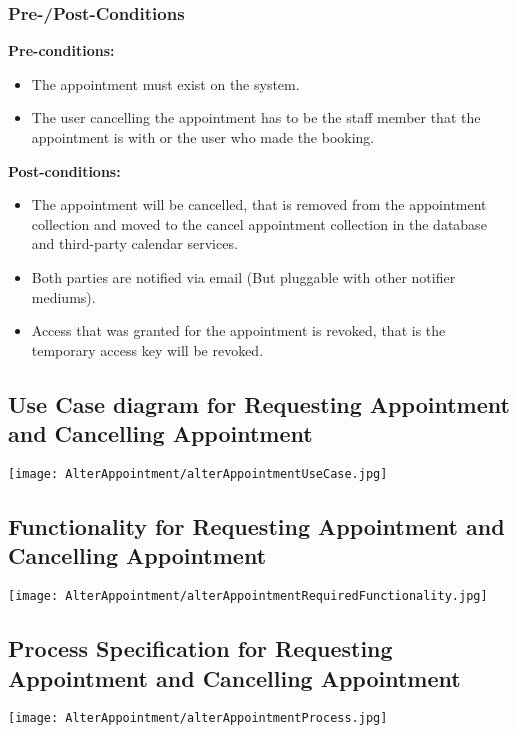 \subsubsection{Pre-/Post-Conditions}
\textbf{Pre-conditions:} 
	\begin{itemize}
		\item The appointment must exist on the system.
		\item The user cancelling the appointment has to be the staff member that the appointment is with or the user who made the booking.
	\end{itemize}
\textbf{Post-conditions:} 
	\begin{itemize}
		\item The appointment will be cancelled, that is removed from the appointment collection and moved to the cancel appointment collection in the database and third-party calendar services.
		\item  Both parties are notified via email (But pluggable with other notifier mediums).
		\item Access that was granted for the appointment is revoked, that is the temporary access key will be revoked. 
	\end{itemize}

\subsection{Use Case diagram for Requesting Appointment and Cancelling Appointment}
	\texttt{[image: AlterAppointment/alterAppointmentUseCase.jpg]}
	
\subsection{Functionality for Requesting Appointment and Cancelling Appointment}
	\texttt{[image: AlterAppointment/alterAppointmentRequiredFunctionality.jpg]}
	
\subsection{Process Specification for Requesting Appointment and Cancelling Appointment}
	\texttt{[image: AlterAppointment/alterAppointmentProcess.jpg]}

